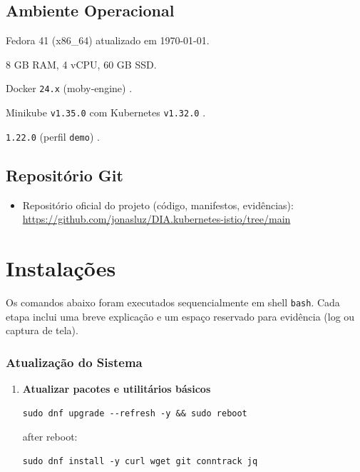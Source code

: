 \documentclass[12pt,a4paper]{report}
\begin{document}
\section{Ambiente Operacional}
\begin{description}[leftmargin=1.5cm]
  \item[Sistema] Fedora 41 (x86\_64) atualizado em \today.
  \item[Recursos] 8 GB RAM, 4 vCPU, 60 GB SSD.
  \item[Container Runtime] Docker \texttt{24.x} (moby‑engine) \cite{docker}.
  \item[Cluster] Minikube \texttt{v1.35.0} com Kubernetes \texttt{v1.32.0} \cite{minikube}.
  \item[Istio] \texttt{1.22.0} (perfil \texttt{demo}) \cite{istio}.
\end{description}

\section{Repositório Git}
\begin{itemize}[leftmargin=*]
  \item Repositório oficial do projeto (código, manifestos, evidências):\\
  \url{https://github.com/jonasluz/DIA.kubernetes-istio/tree/main}
\end{itemize}

\chapter{Instalações}
\label{chap:install}

Os comandos abaixo foram executados sequencialmente em shell \texttt{bash}. Cada
etapa inclui uma breve explicação e um espaço reservado para evidência (log ou
captura de tela).

\subsection{Atualização do Sistema}
\begin{enumerate}
  \item \textbf{Atualizar pacotes e utilitários básicos}
\begin{lstlisting}[style=shell]
sudo dnf upgrade --refresh -y && sudo reboot
\end{lstlisting}
    after reboot:
\begin{lstlisting}[style=shell]
sudo dnf install -y curl wget git conntrack jq
\end{lstlisting}
\end{enumerate}
\end{document}
